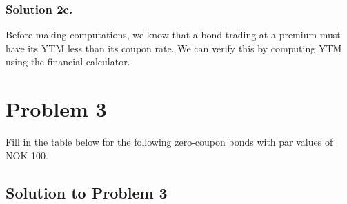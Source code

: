 \documentclass[12]{article}
\begin{document}
\subsubsection*{Solution 2c.}
Before making computations, we know that a bond trading at a premium must have its YTM less than its coupon rate. We can verify this by computing YTM using the financial calculator.
\begin{table}[H]
    \centering
    \label{tab:my_label}
\end{table}


\color{black}
\section*{Problem 3}
Fill in the table below for the following zero-coupon bonds with par values of NOK 100.

\begin{table}[H]
    \centering
    \label{tab:my_label}
\end{table}


\color{blue}
\subsection*{Solution to Problem 3}
\end{document}
